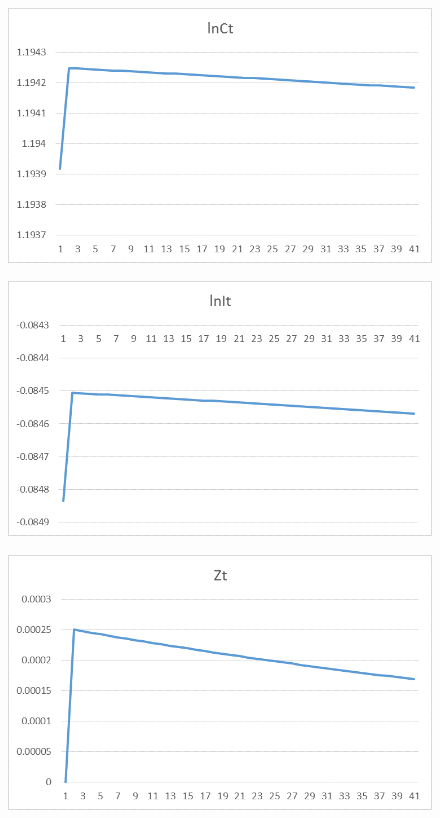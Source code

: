 \documentclass{amsart}
\theoremstyle{plain}
\begin{document}
\begin{figure}[H]
\includegraphics[scale=.50]{13g.png}
\end{figure}
\begin{figure}[H]
\includegraphics[scale=.50]{13h.png}
\end{figure}
\begin{figure}[H]
\includegraphics[scale=.50]{13i.png}
\end{figure}
\end{document}
